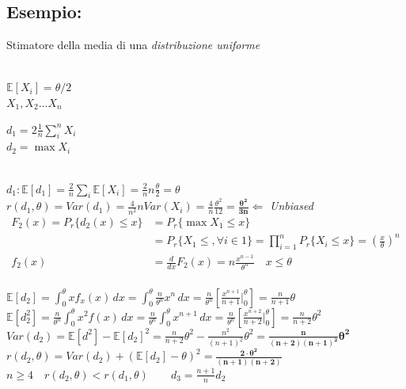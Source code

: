 \documentclass[]{article}
\newcommand{\ev}{\mathbb{E}[X]}
\renewcommand{\ev}[1]{\mathbb{E}\left[#1\right]}
\begin{document}
    \subsection{Esempio:} Stimatore della media di una \textit{distribuzione uniforme} \\\\
    \begin{minipage}{0.4\textwidth}
        $\ev{X_i} = \theta / 2$ \\
        $X_1, X_2 \ldots X_n$
    \end{minipage}
    \begin{minipage}{0.4\textwidth}
        $d_1 = 2 \frac{1}{n} \sum_{i}^{n} X_i$ \\
        $d_2 = \max X_i$
    \end{minipage} \\[4ex]
    $d_1 : \ev{d_1} = \frac{2}{n} \sum_{i}^{} \ev{X_i} = \frac{2}{n} n \frac{\theta}{2} = \theta$ \\
    $r(d_1, \theta) = Var(d_1) = \frac{4}{n^2} n Var(X_i) = \frac{4}{n} \frac{\theta^2}{12} = \boldsymbol{\frac{\theta^2}{3n}} \Leftarrow$ \textit{Unbiased} \\[4ex]
    \begin{equation*}
        \begin{split}
            F_2(x) = P_r \{ d_2(x) \leq x \} &= P_r \{ \max X_1 \leq x \} \\
            &= P_r \{ X_1 \leq, \forall i \in 1 \} = \prod_{i = 1}^{n} P_r \{ X_i \leq x \} = (\frac{x}{\theta})^n \\
            f_2(x) &= \frac{d}{dx} F_2(x) = n \frac{x^{n-1}}{\theta^n} \quad x \leq \theta
        \end{split}
    \end{equation*} \\[6ex]
    $\displaystyle \ev{d_2} = \int_{0}^{\theta} x f_x(x) \, dx = \int_{0}^{\theta} \frac{n}{\theta^n} x^n \, dx = \frac{n}{\theta^n} \left[ \frac{x^{n+1}}{n+1} \bigg\rvert_{0}^{\theta}\right] = \frac{n}{n+1} \theta$ \\[2ex]
    $\displaystyle \ev{d_2^2} = \frac{n}{\theta^n} \int_{0}^{\theta} x^2 f(x) \, dx = \frac{n}{\theta^n} \int_{0}^{\theta} x^{n+1} \, dx = \frac{n}{\theta^n} \left[ \frac{x^{n+2}}{n+2} \bigg\rvert_{0}^{\theta}\right] = \frac{n}{n+2} \theta^2$ \\[2ex]
    $Var(d_2) = \ev{d^2} - \ev{d_2}^2 = \frac{n}{n+2}\theta^2 - \frac{n^2}{(n+1)^2} \theta^2 = \boldsymbol{\frac{n}{(n+2)(n+1)^2} \theta^2}$ \\[4ex]
    $r(d_2, \theta) = Var(d_2) + (\ev{d_2} - \theta)^2 = \boldsymbol{\frac{2 \cdot \theta^2}{(n+1)(n+2)}}$ \\[4ex]
    $n \geq 4 \quad r(d_2, \theta) < r(d_1, \theta) \quad \quad d_3 = \frac{n+1}{n} d_2$
\end{document}
